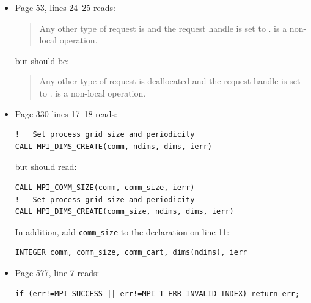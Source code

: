 \begin{itemize}

\item Page 53, lines 24--25 reads:

\begin{quote}
Any other type of request is and the request handle is set to .  is a non-local operation.
\end{quote}

\noindent but should be:

\begin{quote}
Any other type of request is deallocated and the request handle is set to .  is a non-local operation.
\end{quote}

\item Page 330 lines 17--18 reads:

\begin{verbatim}
!   Set process grid size and periodicity
CALL MPI_DIMS_CREATE(comm, ndims, dims, ierr)
\end{verbatim}

\noindent but should read:

\begin{verbatim}
CALL MPI_COMM_SIZE(comm, comm_size, ierr)
!   Set process grid size and periodicity
CALL MPI_DIMS_CREATE(comm_size, ndims, dims, ierr)
\end{verbatim}
In addition, add \texttt{comm\_size} to the declaration on line 11:
\begin{verbatim}
INTEGER comm, comm_size, comm_cart, dims(ndims), ierr
\end{verbatim}



\item Page 577, line 7 reads:
\begin{verbatim}
if (err!=MPI_SUCCESS || err!=MPI_T_ERR_INVALID_INDEX) return err;
\end{verbatim}


\end{itemize}
